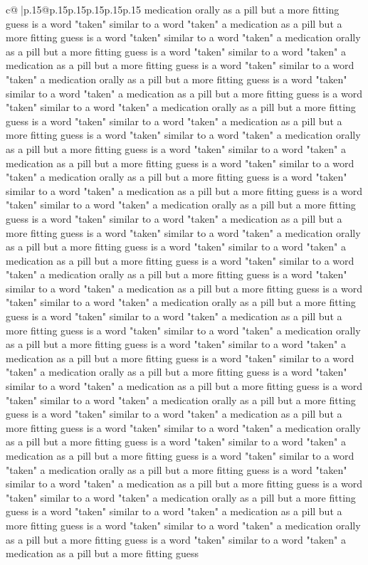 \documentclass{article}
\begin{document}
{\begin{supertabular}{c@{$\;$}|p{.15\linewidth}@{}p{.15\linewidth}p{.15\linewidth}p{.15\linewidth}p{.15\linewidth}p{.15\linewidth}}
{{{medication orally as a pill but a more fitting guess is a word "taken" similar to a word "taken" a medication as a pill but a more fitting guess is a word "taken" similar to a word "taken" a medication orally as a pill but a more fitting guess is a word "taken" similar to a word "taken" a medication as a pill but a more fitting guess is a word "taken" similar to a word "taken" a medication orally as a pill but a more fitting guess is a word "taken" similar to a word "taken" a medication as a pill but a more fitting guess is a word "taken" similar to a word "taken" a medication orally as a pill but a more fitting guess is a word "taken" similar to a word "taken" a medication as a pill but a more fitting guess is a word "taken" similar to a word "taken" a medication orally as a pill but a more fitting guess is a word "taken" similar to a word "taken" a medication as a pill but a more fitting guess is a word "taken" similar to a word "taken" a medication orally as a pill but a more fitting guess is a word "taken" similar to a word "taken" a medication as a pill but a more fitting guess is a word "taken" similar to a word "taken" a medication orally as a pill but a more fitting guess is a word "taken" similar to a word "taken" a medication as a pill but a more fitting guess is a word "taken" similar to a word "taken" a medication orally as a pill but a more fitting guess is a word "taken" similar to a word "taken" a medication as a pill but a more fitting guess is a word "taken" similar to a word "taken" a medication orally as a pill but a more fitting guess is a word "taken" similar to a word "taken" a medication as a pill but a more fitting guess is a word "taken" similar to a word "taken" a medication orally as a pill but a more fitting guess is a word "taken" similar to a word "taken" a medication as a pill but a more fitting guess is a word "taken" similar to a word "taken" a medication orally as a pill but a more fitting guess is a word "taken" similar to a word "taken" a medication as a pill but a more fitting guess is a word "taken" similar to a word "taken" a medication orally as a pill but a more fitting guess is a word "taken" similar to a word "taken" a medication as a pill but a more fitting guess is a word "taken" similar to a word "taken" a medication orally as a pill but a more fitting guess is a word "taken" similar to a word "taken" a medication as a pill but a more fitting guess is a word "taken" similar to a word "taken" a medication orally as a pill but a more fitting guess is a word "taken" similar to a word "taken" a medication as a pill but a more fitting guess is a word "taken" similar to a word "taken" a medication orally as a pill but a more fitting guess is a word "taken" similar to a word "taken" a medication as a pill but a more fitting guess is a word "taken" similar to a word "taken" a medication orally as a pill but a more fitting guess is a word "taken" similar to a word "taken" a medication as a pill but a more fitting guess is a word "taken" similar to a word "taken" a medication orally as a pill but a more fitting guess is a word "taken" similar to a word "taken" a medication as a pill but a more fitting guess }}}
\end{supertabular}}
\end{document}
